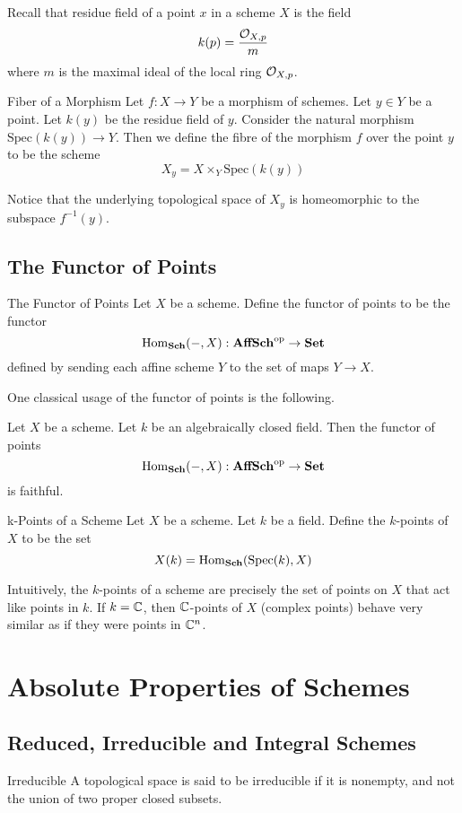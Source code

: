 \documentclass[a4paper]{article}
\begin{document}
Recall that residue field of a point $x$ in a scheme $X$ is the field $$k(p)=\frac{\mathcal{O}_{X,p}}{m}$$ where $m$ is the maximal ideal of the local ring $\mathcal{O}_{X,p}$. 

\begin{defn}{Fiber of a Morphism}{} Let $f:X\to Y$ be a morphism of schemes. Let $y\in Y$ be a point. Let $k(y)$ be the residue field of $y$. Consider the natural morphism $\text{Spec}(k(y))\to Y$. Then we define the fibre of the morphism $f$ over the point $y$ to be the scheme $$X_y=X\times_Y\text{Spec}(k(y))$$
\end{defn}

Notice that the underlying topological space of $X_y$ is homeomorphic to the subspace $f^{-1}(y)$. 

\subsection{The Functor of Points}
\begin{defn}{The Functor of Points}{} Let $X$ be a scheme. Define the functor of points to be the functor $$\operatorname{Hom}_\bold{Sch}(-,X):\bold{AffSch}^\text{op}\to\bold{Set}$$ defined by sending each affine scheme $Y$ to the set of maps $Y\to X$. 
\end{defn}

One classical usage of the functor of points is the following. 

\begin{lmm}{}{} Let $X$ be a scheme. Let $k$ be an algebraically closed field. Then the functor of points $$\operatorname{Hom}_\bold{Sch}(-,X):\bold{AffSch}^\text{op}\to\bold{Set}$$ is faithful. 
\end{lmm}

\begin{defn}{k-Points of a Scheme}{} Let $X$ be a scheme. Let $k$ be a field. Define the $k$-points of $X$ to be the set $$X(k)=\operatorname{Hom}_\bold{Sch}(\text{Spec}(k),X)$$
\end{defn}

Intuitively, the $k$-points of a scheme are precisely the set of points on $X$ that act like points in $k$. If $k=\mathbb{C}$, then $\mathbb{C}$-points of $X$ (complex points) behave very similar as if they were points in $\mathbb{C}^n$. 

\pagebreak
\section{Absolute Properties of Schemes}
\subsection{Reduced, Irreducible and Integral Schemes}
\begin{defn}{Irreducible}{} A topological space is said to be irreducible if it is nonempty, and not the union of two proper closed subsets. 
\end{defn}
\end{document}
